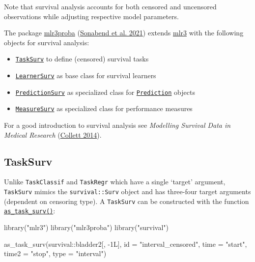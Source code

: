 \documentclass[
]{scrbook}
\newenvironment{Shaded}{\begin{snugshade}}{\end{snugshade}}
\newcommand{\AttributeTok}[1]{\textcolor[rgb]{0.77,0.63,0.00}{#1}}
\newcommand{\FunctionTok}[1]{\textcolor[rgb]{0.00,0.00,0.00}{#1}}
\newcommand{\NormalTok}[1]{#1}
\newcommand{\SpecialCharTok}[1]{\textcolor[rgb]{0.00,0.00,0.00}{#1}}
\newcommand{\StringTok}[1]{\textcolor[rgb]{0.31,0.60,0.02}{#1}}
\providecommand{\tightlist}{%
  \setlength{\itemsep}{0pt}\setlength{\parskip}{0pt}}
\renewenvironment{Shaded} {\begin{snugshade}\small} {\end{snugshade}}
\begin{document}
Note that survival analysis accounts for both censored and uncensored observations while adjusting respective model parameters.

The package \href{https://mlr3proba.mlr-org.com}{mlr3proba} (\protect\hyperlink{ref-mlr3proba}{Sonabend et al. 2021}) extends \href{https://mlr3.mlr-org.com}{mlr3} with the following objects for survival analysis:

\begin{itemize}
\tightlist
\item
  \href{https://mlr3proba.mlr-org.com/reference/TaskSurv.html}{\texttt{TaskSurv}} to define (censored) survival tasks
\item
  \href{https://mlr3proba.mlr-org.com/reference/LearnerSurv.html}{\texttt{LearnerSurv}} as base class for survival learners
\item
  \href{https://mlr3proba.mlr-org.com/reference/PredictionSurv.html}{\texttt{PredictionSurv}} as specialized class for \href{https://mlr3.mlr-org.com/reference/Prediction.html}{\texttt{Prediction}} objects
\item
  \href{https://mlr3proba.mlr-org.com/reference/MeasureSurv.html}{\texttt{MeasureSurv}} as specialized class for performance measures
\end{itemize}

For a good introduction to survival analysis see \emph{Modelling Survival Data in Medical Research} (\protect\hyperlink{ref-Collett2014}{Collett 2014}).

\hypertarget{tasksurv}{%
\subsection{TaskSurv}\label{tasksurv}}

Unlike \texttt{TaskClassif} and \texttt{TaskRegr} which have a single `target' argument, \texttt{TaskSurv} mimics the
\texttt{survival::Surv} object and has three-four target arguments (dependent on censoring type).
A \texttt{TaskSurv} can be constructed with the function \href{https://mlr3proba.mlr-org.com/reference/as_task_surv.html}{\texttt{as\_task\_surv()}}:

\begin{Shaded}
\begin{Highlighting}[]
\FunctionTok{library}\NormalTok{(}\StringTok{"mlr3"}\NormalTok{)}
\FunctionTok{library}\NormalTok{(}\StringTok{"mlr3proba"}\NormalTok{)}
\FunctionTok{library}\NormalTok{(}\StringTok{"survival"}\NormalTok{)}

\FunctionTok{as\_task\_surv}\NormalTok{(survival}\SpecialCharTok{::}\NormalTok{bladder2[, }\SpecialCharTok{{-}}\NormalTok{1L], }\AttributeTok{id =} \StringTok{"interval\_censored"}\NormalTok{,}
  \AttributeTok{time =} \StringTok{"start"}\NormalTok{, }\AttributeTok{time2 =} \StringTok{"stop"}\NormalTok{, }\AttributeTok{type =} \StringTok{"interval"}\NormalTok{)}
\end{Highlighting}
\end{Shaded}
\end{document}
